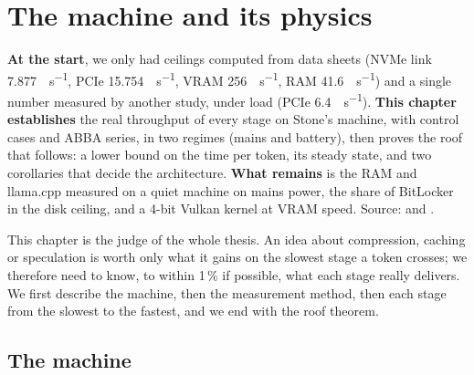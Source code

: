 \chapter{The machine and its physics}\label{ch:machine}

\begin{origine}
\textbf{At the start}, we only had ceilings computed from data sheets (NVMe link \SI{7.877}{\Go\per\second}, PCIe \SI{15.754}{\Go\per\second}, VRAM \SI{256}{\Go\per\second}, RAM \SI{41.6}{\Go\per\second}) and a single number measured by another study, under load (PCIe \SI{6.4}{\Go\per\second}).
\textbf{This chapter establishes} the real throughput of every stage on Stone's machine, with control cases and ABBA series, in two regimes (mains and battery), then proves the roof that follows: a lower bound on the time per token, its steady state, and two corollaries that decide the architecture.
\textbf{What remains} is the RAM and llama.cpp measured on a quiet machine on mains power, the share of BitLocker in the disk ceiling, and a 4-bit Vulkan kernel at VRAM speed.
Source:  and .
\end{origine}

This chapter is the judge of the whole thesis. An idea about compression, caching or speculation is worth only what it gains on the slowest stage a token crosses; we therefore need to know, to within 1\,\% if possible, what each stage really delivers. We first describe the machine, then the measurement method, then each stage from the slowest to the fastest, and we end with the roof theorem.

\section{The machine}\label{sec:machine-releve}

